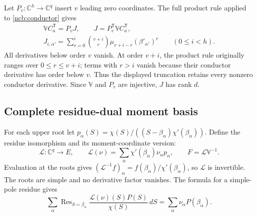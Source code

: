 \documentclass[11pt,a4paper]{article}
\begin{document}
Let $P_v:\mathbb C^h\to\mathbb C^q$ insert $v$ leading zero
coordinates. The full product rule applied to \eqref{ncb:conductor}
gives
\begin{equation}\tag{NCB4}\label{ncb:moment-conductor}
\begin{gathered}
\mathbb VC_a^{\mathsf T}=P_vJ,\qquad
J=P_v^{\mathsf T}\mathbb VC_a^{\mathsf T},\\
J_{i,\alpha'}=\sum_{r=0}^{i}
\binom{v+i}{r}\mu_{v+i-r}(\beta'_{\alpha'})^r
\qquad(0\leq i<h).
\end{gathered}
\end{equation}
All derivatives below order $v$ vanish. At order $v+i$, the product
rule originally ranges over $0\leq r\leq v+i$; terms with $r>i$
vanish because their conductor derivative has order below $v$.
Thus the displayed truncation retains every nonzero conductor
derivative. Since $\mathbb V$ and $P_v$ are injective, $J$ has rank $d$.

\subsection{Complete residue-dual moment basis}
For each upper root let
$p_\alpha(S)=\chi(S)/((S-\beta_\alpha)\chi'(\beta_\alpha))$.
Define the residue isomorphism and its moment-coordinate version:
\begin{equation}\tag{NCB5}\label{ncb:residue}
\mathcal L:\mathbb C^q\longrightarrow E,\qquad
\mathcal L(\nu)=\sum_\alpha\chi'(\beta_\alpha)\nu_\alpha p_\alpha,
\qquad F=\mathcal L\mathbb V^{-1}.
\end{equation}
Evaluation at the roots gives
$(\mathcal L^{-1}f)_\alpha=f(\beta_\alpha)/\chi'(\beta_\alpha)$,
so $\mathcal L$ is invertible. The roots are simple and no derivative
factor vanishes. The formula for a simple-pole residue gives
\[
\sum_\alpha\operatorname{Res}_{S=\beta_\alpha}
\frac{\mathcal L(\nu)(S)P(S)}{\chi(S)}\,dS
=\sum_\alpha\nu_\alpha P(\beta_\alpha).
\]
\end{document}
